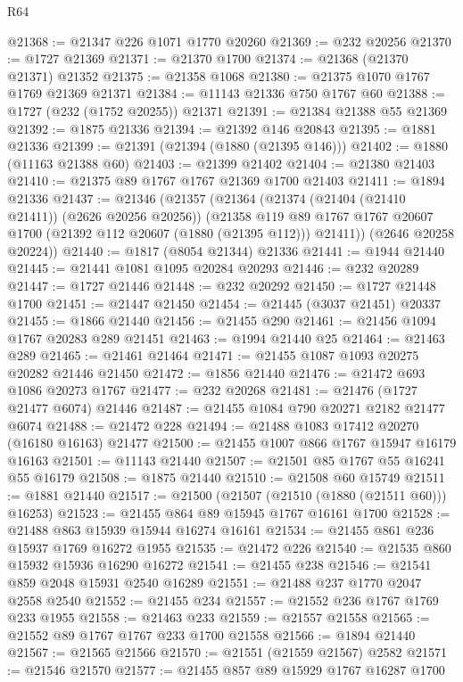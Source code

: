 \begin{lexlean}{R64}
\begin{coremodule}
@21368 := @21347 @226 @1071 @1770 @20260
@21369 := @232 @20256
@21370 := @1727 @21369
@21371 := @21370 @1700
@21374 := @21368 (@21370 @21371) @21352
@21375 := @21358 @1068
@21380 := @21375 @1070 @1767 @1769 @21369 @21371
@21384 := @11143 @21336 @750 @1767 @60
@21388 := @1727 (@232 (@1752 @20255)) @21371
@21391 := @21384 @21388 @55 @21369
@21392 := @1875 @21336
@21394 := @21392 @146 @20843
@21395 := @1881 @21336
@21399 := @21391 (@21394 (@1880 (@21395 @146)))
@21402 := @1880 (@11163 @21388 @60)
@21403 := @21399 @21402
@21404 := @21380 @21403
@21410 := @21375 @89 @1767 @1767 @21369 @1700 @21403
@21411 := @1894 @21336
@21437 := @21346
    (@21357
      (@21364
        (@21374 (@21404 (@21410 @21411)) (@2626 @20256 @20256))
        (@21358
          @119
          @89
          @1767
          @1767
          @20607
          @1700
          (@21392 @112 @20607 (@1880 (@21395 @112)))
          @21411))
      (@2646 @20258 @20224))
@21440 := @1817 (@8054 @21344) @21336
@21441 := @1944 @21440
@21445 := @21441 @1081 @1095 @20284 @20293
@21446 := @232 @20289
@21447 := @1727 @21446
@21448 := @232 @20292
@21450 := @1727 @21448 @1700
@21451 := @21447 @21450
@21454 := @21445 (@3037 @21451) @20337
@21455 := @1866 @21440
@21456 := @21455 @290
@21461 := @21456 @1094 @1767 @20283 @289 @21451
@21463 := @1994 @21440 @25
@21464 := @21463 @289
@21465 := @21461 @21464
@21471 := @21455 @1087 @1093 @20275 @20282 @21446 @21450
@21472 := @1856 @21440
@21476 := @21472 @693 @1086 @20273 @1767
@21477 := @232 @20268
@21481 := @21476 (@1727 @21477 @6074) @21446
@21487 := @21455 @1084 @790 @20271 @2182 @21477 @6074
@21488 := @21472 @228
@21494 := @21488 @1083 @17412 @20270 (@16180 @16163) @21477
@21500 := @21455 @1007 @866 @1767 @15947 @16179 @16163
@21501 := @11143 @21440
@21507 := @21501 @85 @1767 @55 @16241 @55 @16179
@21508 := @1875 @21440
@21510 := @21508 @60 @15749
@21511 := @1881 @21440
@21517 := @21500 (@21507 (@21510 (@1880 (@21511 @60))) @16253)
@21523 := @21455 @864 @89 @15945 @1767 @16161 @1700
@21528 := @21488 @863 @15939 @15944 @16274 @16161
@21534 := @21455 @861 @236 @15937 @1769 @16272 @1955
@21535 := @21472 @226
@21540 := @21535 @860 @15932 @15936 @16290 @16272
@21541 := @21455 @238
@21546 := @21541 @859 @2048 @15931 @2540 @16289
@21551 := @21488 @237 @1770 @2047 @2558 @2540
@21552 := @21455 @234
@21557 := @21552 @236 @1767 @1769 @233 @1955
@21558 := @21463 @233
@21559 := @21557 @21558
@21565 := @21552 @89 @1767 @1767 @233 @1700 @21558
@21566 := @1894 @21440
@21567 := @21565 @21566
@21570 := @21551 (@21559 @21567) @2582
@21571 := @21546 @21570
@21577 := @21455 @857 @89 @15929 @1767 @16287 @1700

\end{coremodule}
\end{lexlean}
